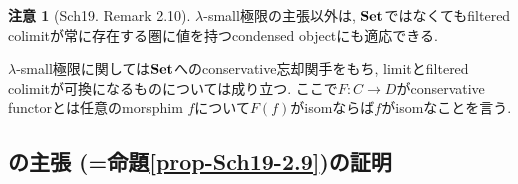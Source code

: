 \documentclass[dvipdfmx,a4paper,11pt]{report}
\theoremstyle{definition}
\newtheorem{rem}[thm]{注意}
\begin{document}
 
 \begin{rem}[Sch19. Remark 2.10]
 $\lambda$-small極限の主張以外は, ${\bf Set}$ではなくてもfiltered colimitが常に存在する圏に値を持つcondensed objectにも適応できる.
 
  $\lambda$-small極限に関しては${\bf Set}$へのconservative忘却関手をもち, limitとfiltered colimitが可換になるものについては成り立つ. 
   ここで$F : C \to D$がconservative functorとは任意のmorsphim $f$について$F(f)$がisomならば$f$がisomなことを言う. 
 \end{rem}


\subsection{\cite[Proposition 2.9]{Sch19}の主張 (=命題\ref{prop-Sch19-2.9})の証明}
\end{document}
